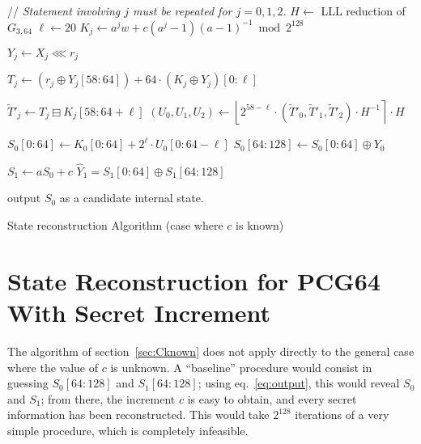 \documentclass[submission,svgnames,journal=tosc]{iacrtrans}
\begin{document}
\begin{algorithm}
\begin{algorithmic}[1]
  \State // \emph{Statement involving $j$ must be repeated for $j=0, 1, 2$.}
  \State $H \gets$ LLL reduction of $G_{3,64}$
  \State $\ell \gets 20$
   
    \State $K_j \gets a^j w + c (a^j - 1)(a-1)^{-1} \bmod 2^{128}$    
    
     
    
    \State $Y_j \gets X_j \lll r_j$ 
    
    \State $T_j \gets \left(r_j \oplus Y_j[58:64]\right) +  64 \cdot \left(K_j \oplus Y_j\right)[0:\ell]$  
    
    \State $\widetilde T'_j \gets T_j \boxminus K_j[58:64+\ell]$  
    \State $(U_0, U_1, U_2) \gets \left\lfloor 2^{58-\ell} \cdot (\widetilde T'_0, \widetilde T'_1, \widetilde T'_2) \cdot  H^{-1} \right\rceil \cdot H$ 

    \State $S_0[0:64] \gets  K_0[0:64] + 2^{\ell} \cdot U_0[0:64-\ell]$ 
    \State $S_0[64:128] \gets S_0[0:64] \oplus Y_0$ 
    
    \State $S_1 \gets a  S_0 + c$ 
    \State $\widehat{Y}_1 =  S_1[0:64] \oplus  S_1[64:128]$
    
     
    \State output $S_0$ as a candidate internal state.
    \EndIf
    \EndFor
    \EndFor
    \EndProcedure
  \end{algorithmic}
  \caption{State reconstruction Algorithm (case where $c$ is known)}
  \label{algo:known}
\end{algorithm}
  
\section{State Reconstruction for \textsf{PCG64} With Secret Increment}
\label{sec:Cunknown}

The algorithm of section~\ref{sec:Cknown} does not apply directly to the general
case where the value of $c$ is unknown. A ``baseline'' procedure would consist
in guessing $S_0[64:128]$ and $S_1[64:128]$; using eq.~\eqref{eq:output}, this
would reveal $S_0$ and $S_1$; from there, the increment $c$ is easy to obtain,
and every secret information has been reconstructed. This would take $2^{128}$
iterations of a very simple procedure, which is completely infeasible.
\end{document}
